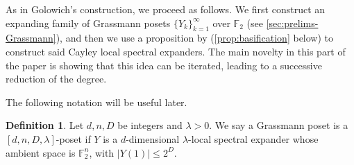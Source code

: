 \documentclass[10pt,a4paper]{article}
\newcommand{\prettyref}[1]{\cref{#1}}
\theoremstyle{definition}
\newtheorem{definition}[theorem]{Definition}
\theoremstyle{remark}
\newcommand\sett[2]{\left\{ #1 \left| \; \vphantom{#1 #2} \right. #2  \right\}}
\newcommand{\set}[1]{\{#1\}}
\def\dim{\mathrm{ dim}}
\def\sp{\mathrm{ span}}
\newcommand{\F}{\mathbb{F}}
\renewcommand{\leq}{\leqslant}
\numberwithin{equation}{section}
\let\pref=\prettyref
\def\S{X}
\def\Gr{\mathcal{G}}
\def\Y{Y}
\def\diml{d}
\def\dimlin{{\diml}}
\def\dimlout{\diml'}
\def\degree{D}
\begin{document}
As in Golowich's construction, we proceed as follows. We first construct an expanding family of Grassmann posets \(\set{\Y_k}_{k=1}^\infty\) over \(\mathbb{F}_2\) (see \pref{sec:prelims-Grassmann}), and then we use a proposition by \cite{Golowich2023} (\pref{prop:basification} below) to construct said Cayley local spectral expanders. The main novelty in this part of the paper is showing that this idea can be iterated, leading to a successive reduction of the degree.%

%
The following notation will be useful later. 
\begin{definition}
    Let \(\diml, n, \degree \) be integers and \(\lambda > 0\). We say a Grassmann poset is a \([\diml,n,\degree,\lambda]\)-poset if \(Y\) is a \(\diml\)-dimensional \(\lambda\)-local spectral expander whose ambient space is \(\F_2^n\), with \(|\Y(1)| \leq 2^\degree\). %
\end{definition}
\end{document}
